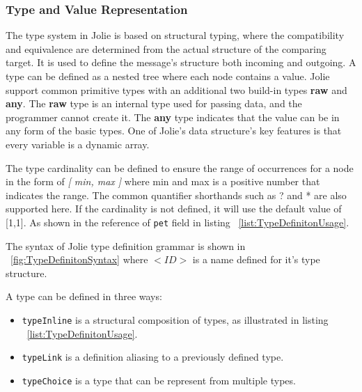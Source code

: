 \subsubsection{Type and Value Representation}
\label{sec:jolie-type-def}

The type system in Jolie is based on structural typing\cite{jolie-type-2019}, where the compatibility and equivalence are determined from the actual structure of the comparing target. It is used to define the message's structure both incoming and outgoing. A type can be defined as a nested tree where each node contains a value. Jolie support common primitive types with an additional two build-in types \textbf{raw} and \textbf{any}. The \textbf{raw} type is an internal type used for passing data, and the programmer cannot create it. The \textbf{any} type indicates that the value can be in any form of the basic types. One of Jolie's data structure's key features is that every variable is a dynamic array.

The type cardinality can be defined to ensure the range of occurrences for a node in the form of \textit{[ min, max ]} where min and max is a positive number that indicates the range. The common quantifier shorthands such as ? and *  are also supported here. If the cardinality is not defined, it will use the default value of [1,1]. As shown in the reference of \texttt{pet} field in listing ~\ref{list:TypeDefinitonUsage}. 

The syntax of Jolie type definition grammar is shown in ~\ref{fig:TypeDefinitonSyntax} where \(<ID>\) is a name defined for it's type structure.

A type can be defined in three ways:
\begin{itemize}
	\item \texttt{typeInline} is a structural composition of types, as illustrated in listing ~\ref{list:TypeDefinitonUsage}.
	\item \texttt{typeLink} is a definition aliasing to a previously defined type.
	\item \texttt{typeChoice} is a type that can be represent from multiple types.
\end{itemize}

